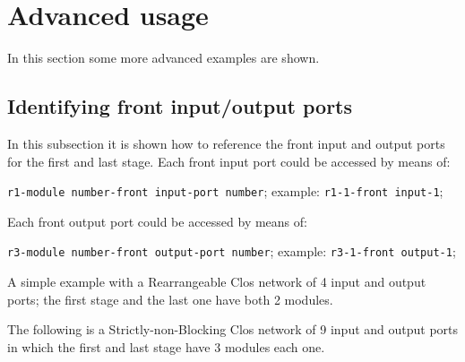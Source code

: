 \documentclass{ltxdoc} %
\begin{document}
\section{Advanced usage}
In this section some more advanced examples are shown.

\subsection{Identifying front input/output ports}
In this subsection it is shown how to reference the front input and output ports for the first and last stage. Each front input port could be accessed by means of:
\begin{flushleft}
\verb|r1-|\bgroup\color{red!75!black}\verb|module number|\egroup\verb|-|\bgroup\color{red!75!black}\verb|front input|\egroup\verb|-|\bgroup\color{red!75!black}\verb|port number|\egroup; example: \verb|r1-1-front input-1|;
\end{flushleft}
Each front output port could be accessed by means of:
\begin{flushleft}
\verb|r3-|\bgroup\color{red!75!black}\verb|module number|\egroup\verb|-|\bgroup\color{red!75!black}\verb|front output|\egroup\verb|-|\bgroup\color{red!75!black}\verb|port number|\egroup; example: \verb|r3-1-front output-1|;
\end{flushleft}

A simple example with a Rearrangeable Clos network of 4 input and output ports; the first stage and the last one have both 2 modules.

\begin{codeexample}[]
\end{codeexample}

The following is a Strictly-non-Blocking Clos network of 9 input and output ports in which the first and last stage have 3 modules each one.

\begin{codeexample}[]
\end{codeexample}
\end{document}
